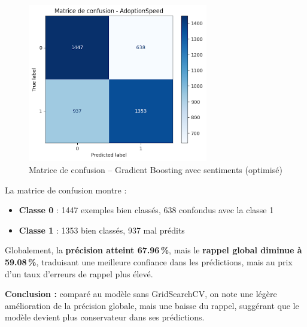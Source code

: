\documentclass[a4paper,12pt]{article}
\begin{document}
\begin{figure}[H]
    \centering
    \includegraphics[width=0.7\textwidth]{matrice_confusion_sentiment_gridsearch.png}
    \caption{Matrice de confusion -- Gradient Boosting avec sentiments (optimisé)}
    \label{fig:matrice_confusion_sentiment_gridsearch}
\end{figure}

La matrice de confusion montre :
\begin{itemize}
    \item \textbf{Classe 0} : 1447 exemples bien classés, 638 confondus avec la classe 1
    \item \textbf{Classe 1} : 1353 bien classés, 937 mal prédits
\end{itemize}

Globalement, la \textbf{précision atteint 67.96\,\%}, mais le \textbf{rappel global diminue à 59.08\,\%}, traduisant une meilleure confiance dans les prédictions, mais au prix d’un taux d’erreurs de rappel plus élevé.

\vspace{0.5em}
\textbf{Conclusion :} comparé au modèle sans GridSearchCV, on note une légère amélioration de la précision globale, mais une baisse du rappel, suggérant que le modèle devient plus conservateur dans ses prédictions.
\end{document}
